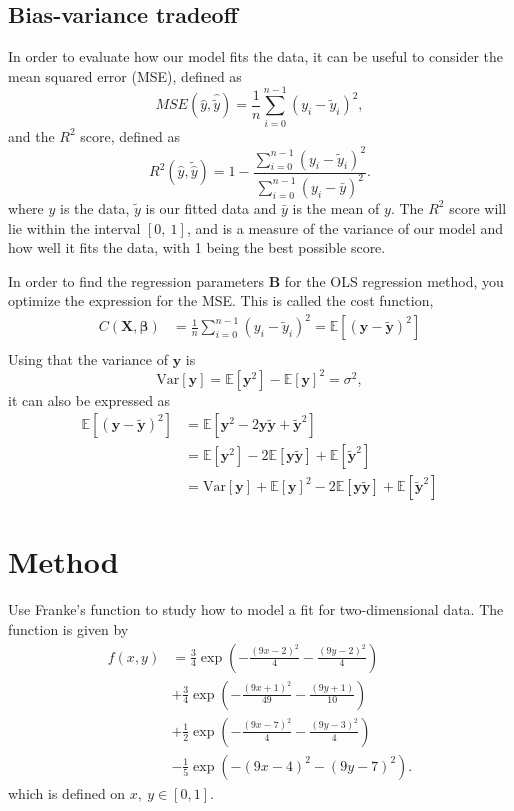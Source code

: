 \documentclass[a4paper, 10pt]{article}
\begin{document}
\begin{multicols}{2}
\subsection{Bias-variance tradeoff}
In order to evaluate how our model fits the data, it can be useful to consider the mean squared error (MSE), defined as 
\begin{equation}
    MSE(\hat{y},\hat{\tilde{y}}) = \frac{1}{n}
    \sum_{i=0}^{n-1}(y_i-\tilde{y}_i)^2, 
    \label{eq:MSE}
\end{equation}
and the $R^2$ score, defined as 
\begin{equation}
    R^2(\hat{y}, \tilde{\hat{y}}) = 1 - \frac{\sum_{i=0}^{n - 1} (y_i - \tilde{y}_i)^2}{\sum_{i=0}^{n - 1} (y_i - \bar{y})^2}.
    \label{eq:R2}
\end{equation}
where $y$ is the data, $\tilde{y}$ is our fitted data and $\bar{y}$ is the mean of $y$.  The $R^2$ score will lie within the interval $[0,\ 1]$, and is a measure of the variance of our model and how well it fits the data, with 1 being the best possible score. 


In order to find the regression parameters $\bm{B}$ for the OLS regression method, you optimize the expression for the MSE. This is called the cost function, 
\begin{align*}
C(\bm{X},\bm{\beta} ) &= \frac{1}{n}\sum_{i=0}^{n-1}(y_i-\tilde{y}_i)^2 = \mathbb{E}[	(\bm{y}-\bm{\tilde{y}})^2] \\
\end{align*}
Using that the variance of $\bm{y}$ is $$\text{Var}[\bm{y}] = \mathbb{E}[\bm{y}^2]-\mathbb{E}[\bm{y}]^2=\sigma^2,$$ it can also be expressed as 
\begin{align*}
\mathbb{E}[	(\bm{y}-\bm{\tilde{y}})^2] &= \mathbb{E}[\bm{y}^2  -2\bm{y}\bm{\tilde{y}}+ \bm { \tilde{y} } ^2 ] \\
&= \mathbb{E}[\bm{y}^2]  - 2\mathbb{E}[\bm{y\tilde{y}}]+\mathbb{E}[\bm{\tilde{y}}^2]\\
&= \text{Var}[\bm{y}] + \mathbb{E}[\bm{y}]^2-2\mathbb{E}[\bm{y\tilde{y}}]+\mathbb{E}[\bm{\tilde{y}}^2]
\end{align*}


\section{Method}
Use Franke's function to study how to model a fit for two-dimensional data. The function is given by 
\begin{align}
f(x,y) &= \frac{3}{4}\exp{\left(-\frac{(9x-2)^2}{4}   - \frac{(9y-2)^2}{4}\right)} \nonumber\\
 &+\frac{3}{4}\exp{\left(-\frac{(9x+1)^2}{49}- \frac{(9y+1)}{10}\right)} \nonumber\\
 &+\frac{1}{2}\exp{\left(-\frac{(9x-7)^2}{4} - \frac{(9y-3)^2}{4}\right)} \nonumber\\
 &-\frac{1}{5}\exp{\left(-(9x-4)^2 - (9y-7)^2\right) }.
\end{align}
 which is defined on $x,\ y \in [0,1]$. 











\end{multicols}
\end{document}
